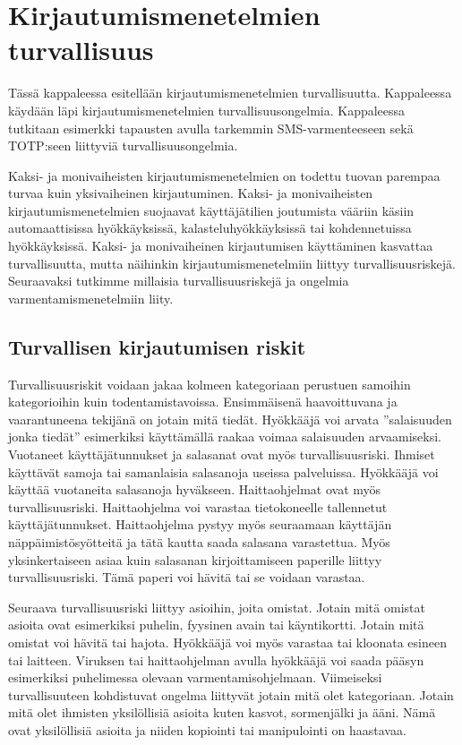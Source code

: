 \chapter{Kirjautumismenetelmien turvallisuus\label{Turvallisuus}}

Tässä kappaleessa esitellään kirjautumismenetelmien turvallisuutta. Kappaleessa käydään läpi kirjautumismenetelmien turvallisuusongelmia. Kappaleessa tutkitaan esimerkki tapausten avulla tarkemmin SMS-varmenteeseen sekä TOTP:seen liittyviä turvallisuusongelmia. 

Kaksi- ja monivaiheisten kirjautumismenetelmien on todettu tuovan parempaa turvaa kuin yksivaiheinen kirjautuminen. Kaksi- ja monivaiheisten kirjautumismenetelmien suojaavat käyttäjätilien joutumista vääriin käsiin automaattisissa hyökkäyksissä, kalasteluhyökkäyksissä tai kohdennetuissa hyökkäyksissä. Kaksi- ja monivaiheinen kirjautumisen käyttäminen kasvattaa turvallisuutta, mutta näihinkin kirjautumismenetelmiin liittyy turvallisuusriskejä. Seuraavaksi tutkimme millaisia turvallisuusriskejä ja ongelmia varmentamismenetelmiin liity. 

\section{Turvallisen kirjautumisen riskit}

Turvallisuusriskit voidaan jakaa kolmeen kategoriaan perustuen samoihin kategorioihin kuin todentamistavoissa. Ensimmäisenä haavoittuvana ja vaarantuneena tekijänä on jotain mitä tiedät. Hyökkääjä voi arvata ”salaisuuden jonka tiedät” esimerkiksi käyttämällä raakaa voimaa salaisuuden arvaamiseksi. Vuotaneet käyttäjätunnukset ja salasanat ovat myös turvallisuusriski. Ihmiset käyttävät samoja tai samanlaisia salasanoja useissa palveluissa. Hyökkääjä voi käyttää vuotaneita salasanoja hyväkseen. Haittaohjelmat ovat myös turvallisuusriski. Haittaohjelma voi varastaa tietokoneelle tallennetut käyttäjätunnukset. Haittaohjelma pystyy myös seuraamaan käyttäjän näppäimistösyötteitä ja tätä kautta saada salasana varastettua. Myös yksinkertaiseen asiaa kuin salasanan kirjoittamiseen paperille liittyy turvallisuusriski. Tämä paperi voi hävitä tai se voidaan varastaa.

Seuraava turvallisuusriski liittyy asioihin, joita omistat. Jotain mitä omistat asioita ovat esimerkiksi puhelin, fyysinen avain tai käyntikortti. Jotain mitä omistat voi hävitä tai hajota. Hyökkääjä voi myös varastaa tai kloonata esineen tai laitteen. Viruksen tai haittaohjelman avulla hyökkääjä voi saada pääsyn esimerkiksi puhelimessa olevaan varmentamisohjelmaan. 
Viimeiseksi turvallisuuteen kohdistuvat ongelma liittyvät jotain mitä olet kategoriaan. Jotain mitä olet ihmisten yksilöllisiä asioita kuten kasvot, sormenjälki ja ääni. Nämä ovat yksilöllisiä asioita ja niiden kopiointi tai manipulointi on haastavaa.

